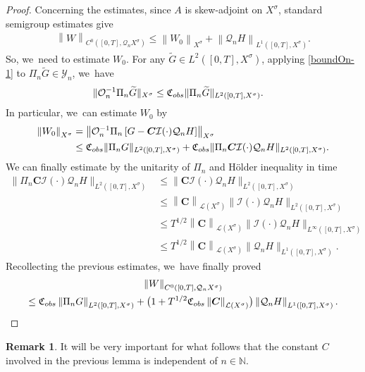 \documentclass[11pt]{article}
\theoremstyle{definition}
\newtheorem{remark}[theorem]{Remark}
\let\mc\mathcal
\renewcommand{\O}{\mc{O}}
\newcommand{\Y}{\mc{Y}}
\newcommand{\N}{\mathbb{N}}
\newcommand{\Q}{\mathcal{Q}}
\newcommand{\bC}{\boldsymbol{C}}
\providecommand{\norm}[1]{\lVert#1\rVert}
\newcommand\nor[2]{\left\|#1\right\|_{#2}}
\begin{document}
\begin{proof}
Concerning the estimates, since $A$ is skew-adjoint on $X^{\sigma}$, standard semigroup estimates give\vspace*{-3pt}
\begin{align}
\nor{W}{C^{0}([0,T],\Q_{n}X^{\sigma})}\leq \nor{W_{0}}{X^{\sigma}}+\nor{\Q_{n} H}{L^{1}([0,T],X^{\sigma})}.
\end{align}
So, we~need to estimate $W_{0}$. For any $\widetilde{G}\in L^2([0, T], X^\sigma)$, applying \eqref{boundOn-1} to $\Pi_n \widetilde{G}\in \Y_n$, we~have\vspace*{-3pt}
\begin{align*}
\norm{\O_n^{-1}\Pi_n \widetilde{G}}_{X^\sigma}&\leq \mathfrak{C}_{\textup{obs}}\norm{\Pi_n\widetilde{G}}_{L^2([0, T], X^\sigma)}.
\end{align*}
In particular, we~can estimate $W_{0}$ by\vspace*{-3pt}
\begin{align*}
\nor{W_{0}}{X^{\sigma}}&= \nor{\O_n^{-1}\Pi_n\left[G-\bC\mc{I}(\cdot)\Q_n H\right]}{X^{\sigma}}\\ &\leq \mathfrak{C}_{\textup{obs}}\norm{\Pi_nG}_{L^2([0, T], X^\sigma)}+\mathfrak{C}_{\textup{obs}}\norm{\Pi_n\bC\mc{I}(\cdot)\Q_n H}_{L^2([0, T], X^\sigma)}.
\end{align*}
We can finally estimate by the unitarity of $\Pi_{n}$ and Hölder inequality in time\vspace*{-3pt}
\begin{align*}
\norm{\Pi_n\bC\mc{I}(\cdot)\Q_n H}_{L^2([0, T], X^\sigma)}&\leq \norm{\bC\mc{I}(\cdot)\Q_n H}_{L^2([0, T], X^\sigma)}\\ &\leq \nor{\bC}{\mc{L}(X^\sigma)}\norm{\mc{I}(\cdot)\Q_n H}_{L^2([0, T], X^\sigma)}\\
&\leq T^{1/2}\nor{\bC}{\mc{L}(X^\sigma)}\norm{\mc{I}(\cdot)\Q_n H}_{L^{\infty}([0, T], X^\sigma)}\\ &\leq T^{1/2}\nor{\bC}{\mc{L}(X^\sigma)}\norm{\Q_n H}_{L^{1}([0, T], X^\sigma)}.
\end{align*}
Recollecting the previous estimates, we~have finally proved\vspace*{-8pt}
\begin{multline*}
\nor{W}{C^{0}([0,T],\Q_{n}X^{\sigma})}\\\leq \mathfrak{C}_{\textup{obs}} \nor{\Pi_{n}G}{L^{2}([0,T],X^{\sigma})}+\bigl(1+T^{1/2}\mathfrak{C}_{\textup{obs}}\nor{\bC}{\mc{L}(X^\sigma)}\bigr)\nor{\Q_{n} H}{L^{1}([0,T],X^{\sigma})}.\qedhere
\end{multline*}
\end{proof}
\begin{remark}
It will be very important for what follows that the constant $C$ involved in the previous lemma is independent of $n\in\N$.
\end{remark}
\end{document}
